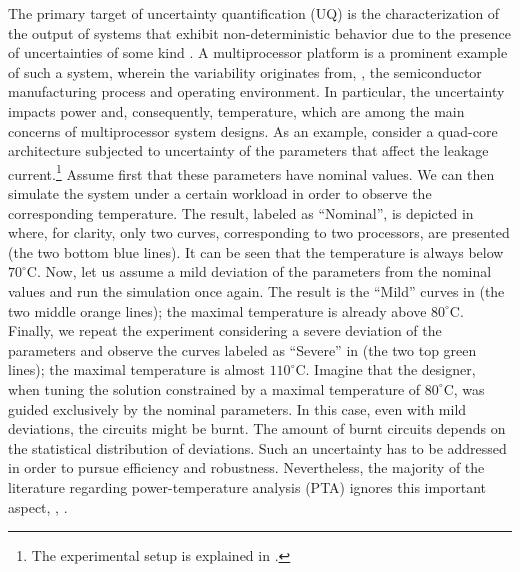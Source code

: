  The primary target of uncertainty quantification (UQ) is the characterization of the output of systems that exhibit non-deterministic behavior due to the presence of uncertainties of some kind \cite{xiu2010, eldred2009}.
 A multiprocessor platform is a prominent example of such a system, wherein the variability originates from, \eg, the semiconductor manufacturing process and operating environment.
 In particular, the uncertainty impacts power and, consequently, temperature, which are among the main concerns of multiprocessor system designs.
 As an example, consider a quad-core architecture subjected to uncertainty of the parameters that affect the leakage current.\footnote{The experimental setup is explained in .}
 Assume first that these parameters have nominal values. We can then simulate the system under a certain workload in order to observe the corresponding temperature.
 The result, labeled as ``Nominal'', is depicted in  where, for clarity, only two curves, corresponding to two processors, are presented (the two bottom blue lines). It can be seen that the temperature is always below $70^{\circ}$C. Now, let us assume a mild deviation of the parameters from the nominal values and run the simulation once again.
 The result is the ``Mild'' curves in  (the two middle orange lines); the maximal temperature is already above $80^{\circ}$C.
 Finally, we repeat the experiment considering a severe deviation of the parameters and observe the curves labeled as ``Severe'' in  (the two top green lines); the maximal temperature is almost $110^{\circ}$C.
 Imagine that the designer, when tuning the solution constrained by a maximal temperature of $80^\circ$C, was guided exclusively by the nominal parameters. In this case, even with mild deviations, the circuits might be burnt.
 The amount of burnt circuits depends on the statistical distribution of deviations.
 Such an uncertainty has to be addressed in order to pursue efficiency and robustness.
 Nevertheless, the majority of the literature regarding power-temperature analysis (PTA) ignores this important aspect, \eg, \cite{rao2009, rai2011, thiele2011, ukhov2012}.


